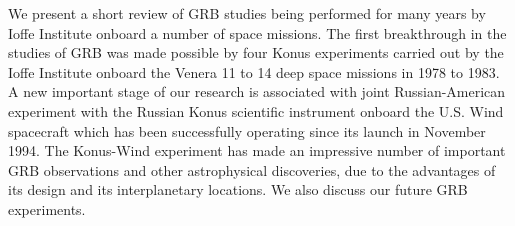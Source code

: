 


\bigskip



\bigskip

\noindent We present a short review of GRB studies being performed for many years by Ioffe Institute onboard a number of space missions. The first breakthrough in the studies of GRB was made possible by four Konus experiments carried out by the Ioffe Institute onboard the Venera 11 to 14 deep space missions in 1978 to 1983. A new important stage of our research  is associated with joint Russian-American experiment with the Russian Konus scientific instrument onboard the U.S. Wind spacecraft which has been successfully operating since its launch in November 1994. The Konus-Wind experiment has made an impressive number of important GRB observations and other astrophysical discoveries, due to the advantages of its design and its interplanetary locations. We also discuss our future GRB experiments.
